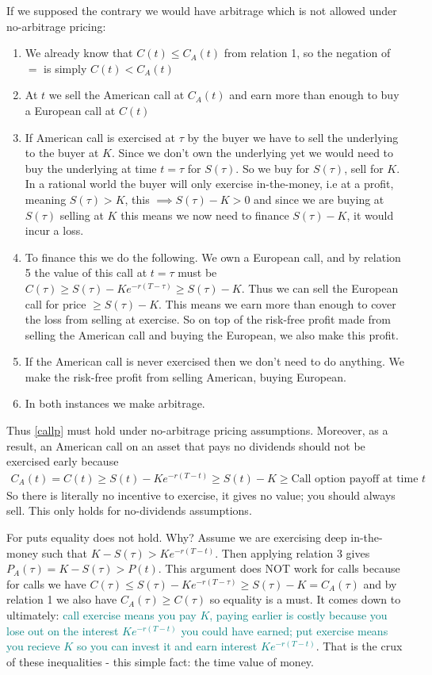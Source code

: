 \documentclass[9pt]{extarticle}
\begin{document}
If we supposed the contrary we would have arbitrage which is not allowed under no-arbitrage pricing:
\begin{enumerate}
  \item We already know that $C(t) \leq C_A(t)$ from relation 1, so the negation of $=$ is simply $C(t) < C_A(t)$
  \item At $t$ we sell the American call at $C_A(t)$ and earn more than enough to buy a European call at $C(t)$
  \item If American call is exercised at $\tau$ by the buyer we have to sell the underlying to the buyer at $K$. Since 
  we don't own the underlying yet we would need to buy the underlying at time $t=\tau$ for $S(\tau)$. So we 
  buy for $S(\tau)$, sell for $K$. In a rational world the buyer will only exercise in-the-money, i.e at a profit, meaning 
  $S(\tau) > K$, this $\implies S(\tau) - K > 0$ and since we are buying at $S(\tau)$ selling at $K$ this means  we now need 
  to finance $S(\tau) - K$, it would incur a loss.
  \item To finance this we do the following. We own a European call, and by relation 5 the value of this 
  call at $t=\tau$ must be $C(\tau) \geq S(\tau) - Ke^{-r(T-\tau)} \geq S(\tau) - K$. 
  Thus we can sell the European call for price $\geq S(\tau) - K$. This means we earn more than enough to cover the loss from selling at exercise. So on top 
  of the risk-free profit made from selling the American call and buying the European, we also make this profit.
  \item If the American call is never exercised then we don't need to do anything. We make the risk-free profit from selling American, buying European.
  \item In both instances we make arbitrage.
\end{enumerate}
Thus \eqref{callp} must hold under no-arbitrage pricing assumptions. Moreover, as a result, an American call on an asset that pays no dividends should not be exercised early because 
\begin{align}
  C_A(t) = C(t) \geq S(t) - Ke^{-r(T-t)} \geq S(t) - K \geq \text{Call option payoff at time } t 
\end{align}
So there is literally no incentive to exercise, it gives no value; you should always sell. This only holds for no-dividends assumptions. 

For puts equality does not hold. Why? Assume we are exercising deep in-the-money such that  $K-S(\tau)> Ke^{-r(T-t)}$. Then applying relation 3 
gives $P_A(\tau) = K-S(\tau) > P(t)$. This argument does NOT work for calls because for calls we have $C(\tau) \leq S(\tau) - Ke^{-r(T-\tau)}\geq S(\tau) - K = C_A(\tau)$ and 
by relation 1 we also have $C_A(\tau) \geq C(\tau)$ so equality is a must. It comes down to ultimately: \textcolor{teal}{call exercise means you pay $K$, paying earlier 
is costly because you lose out on the interest $Ke^{-r(T-t)}$ you could have earned; put exercise means you recieve $K$ so you can invest it and earn interest $Ke^{-r(T-t)}$}. That 
is the crux of these inequalities - this simple fact: the time value of money.
\end{document}
